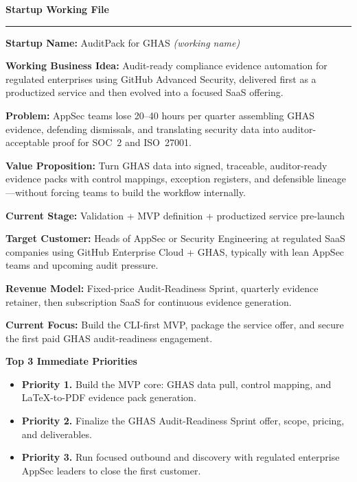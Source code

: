 \documentclass[10pt]{article}
\newcommand{\entry}[2]{\textbf{#1} #2\par}
\newcommand{\stagebox}[1]{\fcolorbox{black}{gray!8}{\strut\hspace{0.4em}#1\hspace{0.4em}}}
\begin{document}
\small

{\LARGE\bfseries Startup Working File} \hfill \stagebox{Living Document - One Page}

\vspace{4pt}
\hrule
\vspace{6pt}

\entry{Startup Name:}{AuditPack for GHAS \textit{(working name)}}
\entry{Working Business Idea:}{Audit-ready compliance evidence automation for regulated enterprises using GitHub Advanced Security, delivered first as a productized service and then evolved into a focused SaaS offering.}

\begin{minipage}[t]{0.49\textwidth}
\entry{Problem:}{AppSec teams lose 20--40 hours per quarter assembling GHAS evidence, defending dismissals, and translating security data into auditor-acceptable proof for SOC~2 and ISO~27001.}
\entry{Value Proposition:}{Turn GHAS data into signed, traceable, auditor-ready evidence packs with control mappings, exception registers, and defensible lineage---without forcing teams to build the workflow internally.}
\entry{Current Stage:}{Validation + MVP definition + productized service pre-launch}
\end{minipage}\hfill
\begin{minipage}[t]{0.49\textwidth}
\entry{Target Customer:}{Heads of AppSec or Security Engineering at regulated SaaS companies using GitHub Enterprise Cloud + GHAS, typically with lean AppSec teams and upcoming audit pressure.}
\entry{Revenue Model:}{Fixed-price Audit-Readiness Sprint, quarterly evidence retainer, then subscription SaaS for continuous evidence generation.}
\entry{Current Focus:}{Build the CLI-first MVP, package the service offer, and secure the first paid GHAS audit-readiness engagement.}
\end{minipage}

\textbf{Top 3 Immediate Priorities}
\begin{itemize}[leftmargin=0pt,label={}]
    \item \textbf{Priority 1.} Build the MVP core: GHAS data pull, control mapping, and LaTeX-to-PDF evidence pack generation.
    \item \textbf{Priority 2.} Finalize the GHAS Audit-Readiness Sprint offer, scope, pricing, and deliverables.
    \item \textbf{Priority 3.} Run focused outbound and discovery with regulated enterprise AppSec leaders to close the first customer.
\end{itemize}
\end{document}

